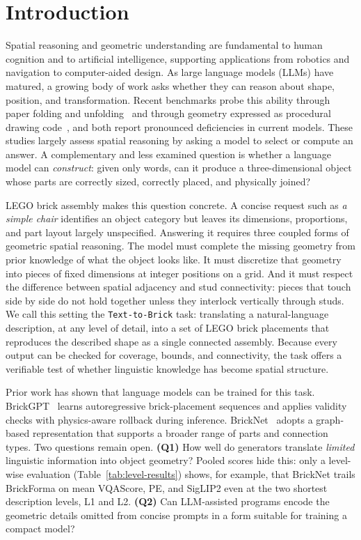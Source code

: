\section{Introduction}
Spatial reasoning and geometric understanding are fundamental to human cognition and to artificial intelligence, supporting applications from robotics and navigation to computer-aided design. As large language models (LLMs) have matured, a growing body of work asks whether they can reason about shape, position, and transformation. Recent benchmarks probe this ability through paper folding and unfolding~\cite{zhou2026paperfoldingpuzzle} and through geometry expressed as procedural drawing code~\cite{luo2026geogrambench}, and both report pronounced deficiencies in current models. These studies largely assess spatial reasoning by asking a model to select or compute an answer. A complementary and less examined question is whether a language model can \emph{construct}: given only words, can it produce a three-dimensional object whose parts are correctly sized, correctly placed, and physically joined?

LEGO brick assembly makes this question concrete. A concise request such as \emph{a simple chair} identifies an object category but leaves its dimensions, proportions, and part layout largely unspecified. Answering it requires three coupled forms of geometric spatial reasoning. The model must complete the missing geometry from prior knowledge of what the object looks like. It must discretize that geometry into pieces of fixed dimensions at integer positions on a grid. And it must respect the difference between spatial adjacency and stud connectivity: pieces that touch side by side do not hold together unless they interlock vertically through studs. We call this setting the \texttt{Text-to-Brick} task: translating a natural-language description, at any level of detail, into a set of LEGO brick placements that reproduces the described shape as a single connected assembly. Because every output can be checked for coverage, bounds, and connectivity, the task offers a verifiable test of whether linguistic knowledge has become spatial structure.

Prior work has shown that language models can be trained for this task. BrickGPT~\cite{brickgpt} learns autoregressive brick-placement sequences and applies validity checks with physics-aware rollback during inference. BrickNet~\cite{bricknet} adopts a graph-based representation that supports a broader range of parts and connection types. Two questions remain open. \textbf{(Q1)} How well do generators translate \emph{limited} linguistic information into object geometry? Pooled scores hide this: only a level-wise evaluation (Table~\ref{tab:level-results}) shows, for example, that BrickNet trails BrickForma on mean VQAScore, PE, and SigLIP2 even at the two shortest description levels, L1 and L2. \textbf{(Q2)} Can LLM-assisted programs encode the geometric details omitted from concise prompts in a form suitable for training a compact model?

